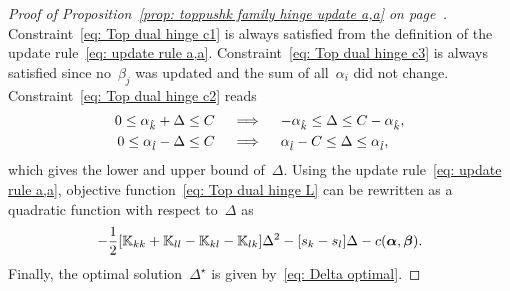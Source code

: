 \topruleaa*
\begin{proof}[Proof of Proposition~\ref{prop: toppushk family hinge update a,a} on page~\pageref{prop: toppushk family hinge update a,a}]
  Constraint~\eqref{eq: Top dual hinge c1} is always satisfied from the definition of the update rule~\eqref{eq: update rule a,a}. Constraint~\eqref{eq: Top dual hinge c3} is always satisfied since no~$\beta_j$ was updated and the sum of all~$\alpha_i$ did not change. Constraint~\eqref{eq: Top dual hinge c2} reads
  \begin{align*}
    0 \leq \alpha_{\hat{k}} + \Delta \leq C
    & \quad \implies \quad
    - \alpha_{\hat{k}} \leq \Delta \leq C - \alpha_{\hat{k}}, \\
    0 \leq \alpha_{\hat{l}} - \Delta \leq C
    & \quad \implies \quad
    \alpha_{\hat{l}} - C \leq \Delta \leq \alpha_{\hat{l}},
  \end{align*}
  which gives the lower and upper bound of~$\Delta.$ Using the update rule~\eqref{eq: update rule a,a}, objective function~\eqref{eq: Top dual hinge L} can be rewritten as a quadratic function with respect to~$\Delta$ as
  \begin{equation*}
    - \frac{1}{2} \Brac[s]{\K_{kk} + \K_{ll} - \K_{kl} - \K_{lk}} \Delta^2
    - \Brac[s]{s_k - s_l} \Delta
    - c(\bm{\alpha}, \bm{\beta}).
  \end{equation*}
  Finally, the optimal solution~$\Delta^{\star}$ is given by~\eqref{eq: Delta optimal}.
\end{proof}

